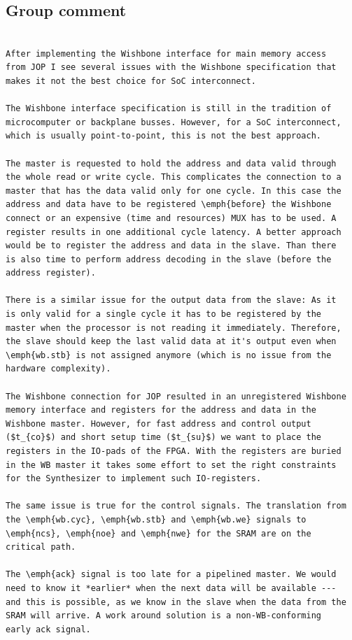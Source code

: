 \documentclass[a4paper,12pt]{scrartcl}
\begin{document}
\subsection{Group comment}
\begin{verbatim}

After implementing the Wishbone interface for main memory access
from JOP I see several issues with the Wishbone specification that
makes it not the best choice for SoC interconnect.

The Wishbone interface specification is still in the tradition of
microcomputer or backplane busses. However, for a SoC interconnect,
which is usually point-to-point, this is not the best approach.

The master is requested to hold the address and data valid through
the whole read or write cycle. This complicates the connection to a
master that has the data valid only for one cycle. In this case the
address and data have to be registered \emph{before} the Wishbone
connect or an expensive (time and resources) MUX has to be used. A
register results in one additional cycle latency. A better approach
would be to register the address and data in the slave. Than there
is also time to perform address decoding in the slave (before the
address register).

There is a similar issue for the output data from the slave: As it
is only valid for a single cycle it has to be registered by the
master when the processor is not reading it immediately. Therefore,
the slave should keep the last valid data at it's output even when
\emph{wb.stb} is not assigned anymore (which is no issue from the
hardware complexity).

The Wishbone connection for JOP resulted in an unregistered Wishbone
memory interface and registers for the address and data in the
Wishbone master. However, for fast address and control output
($t_{co}$) and short setup time ($t_{su}$) we want to place the
registers in the IO-pads of the FPGA. With the registers are buried
in the WB master it takes some effort to set the right constraints
for the Synthesizer to implement such IO-registers.

The same issue is true for the control signals. The translation from
the \emph{wb.cyc}, \emph{wb.stb} and \emph{wb.we} signals to
\emph{ncs}, \emph{noe} and \emph{nwe} for the SRAM are on the
critical path.

The \emph{ack} signal is too late for a pipelined master. We would
need to know it *earlier* when the next data will be available ---
and this is possible, as we know in the slave when the data from the
SRAM will arrive. A work around solution is a non-WB-conforming
early ack signal.


\end{verbatim}
\end{document}
